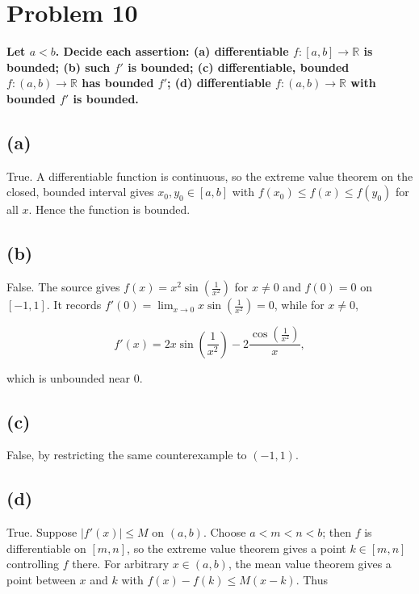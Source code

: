 \section{Problem 10}

\textbf{Let \(a < b\). Decide each assertion: (a) differentiable \(f:\left\lbrack {a,b} \right\rbrack\rightarrow\mathbb{R}\) is bounded; (b) such \(f'\) is bounded; (c) differentiable, bounded \(f:\left( {a,b} \right)\rightarrow\mathbb{R}\) has bounded \(f'\); (d) differentiable \(f:\left( {a,b} \right)\rightarrow\mathbb{R}\) with bounded \(f'\) is bounded.}

\subsection{(a)}

True. A differentiable function is continuous, so the extreme value theorem on the closed, bounded interval gives \(x_{0},y_{0} \in \left\lbrack {a,b} \right\rbrack\) with \(f\left( x_{0} \right) \leq f(x) \leq f\left( y_{0} \right)\) for all \(x\). Hence the function is bounded.

\subsection{(b)}

False. The source gives \(f(x) = x^{2}\sin\left( \frac{1}{x^{2}} \right)\) for \(x \neq 0\) and \(f(0) = 0\) on \(\left\lbrack {- 1,1} \right\rbrack\). It records \(f'(0) = \lim_{x\rightarrow 0}x\sin\left( \frac{1}{x^{2}} \right) = 0\), while for \(x \neq 0\),

\[f'(x) = 2x\sin\left( \frac{1}{x^{2}} \right) - 2\frac{\cos\left( \frac{1}{x^{2}} \right)}{x},\]

which is unbounded near \(0\).

\subsection{(c)}

False, by restricting the same counterexample to \(\left( {- 1,1} \right)\).

\subsection{(d)}

True. Suppose \(\left| {f'(x)} \right| \leq M\) on \(\left( {a,b} \right)\). Choose \(a < m < n < b\); then \(f\) is differentiable on \(\left\lbrack {m,n} \right\rbrack\), so the extreme value theorem gives a point \(k \in \left\lbrack {m,n} \right\rbrack\) controlling \(f\) there. For arbitrary \(x \in \left( {a,b} \right)\), the mean value theorem gives a point between \(x\) and \(k\) with \(f(x) - f(k) \leq M\left( {x - k} \right)\). Thus

